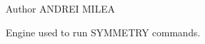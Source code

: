 \begin{DoxyAuthor}{Author}
A\-N\-D\-R\-E\-I M\-I\-L\-E\-A
\end{DoxyAuthor}
Engine used to run S\-Y\-M\-M\-E\-T\-R\-Y commands. 